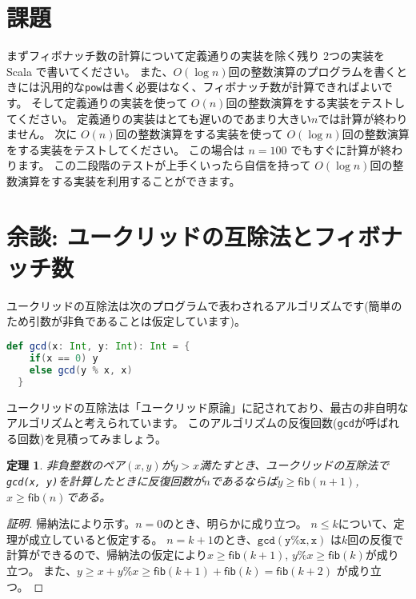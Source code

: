 \documentclass[a4paper,twoside,onecolumn,openany,article]{memoir}
\theoremstyle{plain}
\newtheorem{theorem}{定理}
\theoremstyle{remark}
\begin{document}
\section{課題}
まずフィボナッチ数の計算について定義通りの実装を除く残り 2つの実装を Scala で書いてください。
また、$O(\log n)$回の整数演算のプログラムを書くときには汎用的な\texttt{pow}は書く必要はなく、フィボナッチ数が計算できればよいです。
そして定義通りの実装を使って $O(n)$回の整数演算をする実装をテストしてください。
定義通りの実装はとても遅いのであまり大きい$n$では計算が終わりません。
次に $O(n)$回の整数演算をする実装を使って
$O(\log n)$回の整数演算をする実装をテストしてください。
この場合は $n=100$ でもすぐに計算が終わります。
この二段階のテストが上手くいったら自信を持って $O(\log n)$回の整数演算をする実装を利用することができます。

\section*{余談: ユークリッドの互除法とフィボナッチ数}
ユークリッドの互除法は次のプログラムで表わされるアルゴリズムです(簡単のため引数が非負であることは仮定しています)。
\begin{lstlisting}[basicstyle=\ttfamily\normalsize,showstringspaces=false,language=scala]
  def gcd(x: Int, y: Int): Int = {
    if(x == 0) y
    else gcd(y % x, x)
  }
\end{lstlisting}
ユークリッドの互除法は「ユークリッド原論」に記されており、最古の非自明なアルゴリズムと考えられています。
このアルゴリズムの反復回数(\texttt{gcd}が呼ばれる回数)を見積ってみましょう。
\begin{theorem}
非負整数のペア$(x,y)$が$y> x$満たすとき、ユークリッドの互除法で\texttt{gcd(x, y)}を計算したときに反復回数が$n$であるならば$y\ge\mathsf{fib}(n+1)$, $x\ge\mathsf{fib}(n)$である。
\end{theorem}
\begin{proof}[証明]
帰納法により示す。$n=0$のとき、明らかに成り立つ。
$n\le k$について、定理が成立していると仮定する。
$n=k+1$のとき、$\mathtt{gcd(y \% x, x)}$ は$k$回の反復で計算ができるので、帰納法の仮定により$x\ge\mathsf{fib}(k+1)$, $y \% x \ge \mathsf{fib}(k)$が成り立つ。
また、$y\ge x + y \% x\ge \mathsf{fib}(k+1) + \mathsf{fib}(k) = \mathsf{fib}(k+2)$ が成り立つ。
\end{proof}
\end{document}
